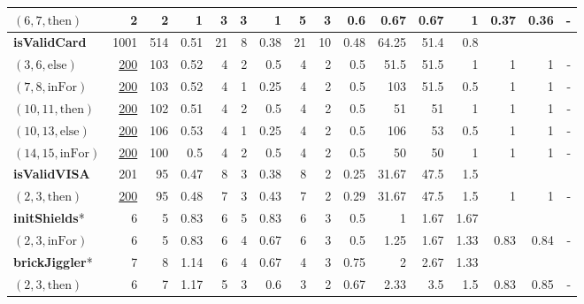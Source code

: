 \documentclass[sigconf,review, anonymous]{acmart}
\newcommand{\thenBr}{\text{then}}
\newcommand{\elseBr}{\text{else}}
\newcommand{\inFor}{\text{inFor}}
\newcommand{\un}[1]{\underline{#1}}
\begin{document}
\begin{table}[!t]
\begin{tabular}{l|rrr|rrr|rrr|rrr|rrr}
    $(6,7,\thenBr)$          & 2        & 2    & 1         & 3  & 3 & 1                 & 5 & 3   & 0.6                & 0.67  & 0.67  & 1     & 0.37 & 0.36 & -  \\
    \hline
   \textbf{isValidCard}      & 1001     & 514  & 0.51      & 21 & 8 & 0.38              & 21 & 10 & 0.48               & 64.25 & 51.4  & 0.8    &   &   &       \\
    $(3,6,\elseBr)$          & \un{200} & 103  & 0.52      & 4  & 2 & 0.5               & 4  & 2  & 0.5                & 51.5  & 51.5  & 1      & 1 & 1 & -   \\
    $(7,8,\inFor)$           & \un{200} & 103  & 0.52      & 4  & 1 & 0.25              & 4  & 2  & 0.5                & 103   & 51.5  & 0.5    & 1 & 1 & -  \\
    $(10,11,\thenBr)$        & \un{200} & 102  & 0.51      & 4  & 2 & 0.5               & 4  & 2  & 0.5                & 51    & 51    & 1      & 1 & 1 & -  \\
    $(10,13,\elseBr)$        & \un{200} & 106  & 0.53      & 4  & 1 & 0.25              & 4  & 2  & 0.5                & 106   & 53    & 0.5    & 1 & 1 & -  \\
    $(14,15,\inFor)$         & \un{200} & 100  & 0.5       & 4  & 2 & 0.5               & 4  & 2  & 0.5                & 50    & 50    & 1      & 1 & 1 & -  \\
    \hline
   \textbf{isValidVISA}      & 201      & 95   & 0.47      & 8  & 3 & 0.38              & 8  & 2  & 0.25               & 31.67 & 47.5  & 1.5    &   &   &       \\
    $(2,3,\thenBr)$          & \un{200} & 95   & 0.48      & 7  & 3 & 0.43              & 7  & 2  & 0.29               & 31.67 & 47.5  & 1.5    & 1 & 1 & -  \\
    \hline
   \textbf{initShields}*     & 6        & 5    & 0.83      & 6  & 5 & 0.83              & 6  & 3  & 0.5                & 1      & 1.67 & 1.67   &      &      &       \\
    $(2,3,\inFor)$           & 6        & 5    & 0.83      & 6  & 4 & 0.67              & 6  & 3  & 0.5                & 1.25   & 1.67 & 1.33   & 0.83 & 0.84 & -  \\
    \hline
   \textbf{brickJiggler}*    & 7        & 8    & 1.14      & 6  & 4 & 0.67              & 4  & 3  & 0.75               & 2      & 2.67 & 1.33   &      &      &       \\
    $(2,3,\thenBr)$          & 6        & 7    & 1.17      & 5  & 3 & 0.6               & 3  & 2  & 0.67               & 2.33   & 3.5  & 1.5    & 0.83 & 0.85 & -  \\

\end{tabular}
\end{table}
\end{document}
